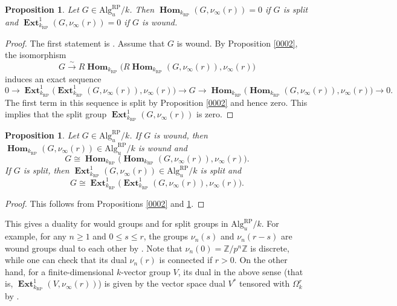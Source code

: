 \documentclass{amsart}
\newtheorem{Prop}[Thm]{Proposition}
\theoremstyle{remark}
\numberwithin{equation}{section}
\newcommand{\isomto}{\overset{\sim}{\to}}
\newcommand{\Z}{\mathbb{Z}}
\newcommand{\Alg}{\mathrm{Alg}}
\newcommand{\alg}[1]{\mathbf{#1}}
\newcommand{\RP}{\mathrm{RP}}
\DeclareMathOperator{\sheafhom}{\alg{Hom}}
\DeclareMathOperator{\sheafext}{\alg{Ext}}
\begin{document}
\begin{Prop} \label{0079}
	Let $G \in \Alg^{\RP}_{u} / k$.
	Then $\sheafhom_{k_{\RP}}(G, \nu_{\infty}(r)) = 0$ if $G$ is split
	and $\sheafext_{k_{\RP}}^{1}(G, \nu_{\infty}(r)) = 0$ if $G$ is wound.
\end{Prop}

\begin{proof}
	The first statement is \cite[Theorem 3.2 (ii)]{Kat86}.
	Assume that $G$ is wound.
	By Proposition \ref{0002}, the isomorphism
		\[
				G
			\isomto
				R \sheafhom_{k_{\RP}} \bigl(
					R \sheafhom_{k_{\RP}}(G, \nu_{\infty}(r)),
					\nu_{\infty}(r)
				\bigr)
		\]
	induces an exact sequence
		\[
				0
			\to
				\sheafext_{k_{\RP}}^{1} \bigl(
					\sheafext_{k_{\RP}}^{1}(G, \nu_{\infty}(r)),
					\nu_{\infty}(r)
				\bigr)
			\to
				G
			\to
				\sheafhom_{k_{\RP}} \bigl(
					\sheafhom_{k_{\RP}}(G, \nu_{\infty}(r)),
					\nu_{\infty}(r)
				\bigr)
			\to
				0.
		\]
	The first term in this sequence is split
	by Proposition \ref{0002} and hence zero.
	This implies that the split group
	$\sheafext_{k_{\RP}}^{1}(G, \nu_{\infty}(r))$ is zero.
\end{proof}

\begin{Prop}
	Let $G \in \Alg_{u}^{\RP} / k$.
	If $G$ is wound,
	then $\sheafhom_{k_{\RP}}(G, \nu_{\infty}(r)) \in \Alg_{u}^{\RP} / k$ is wound
	and
		\[
				G
			\cong
				\sheafhom_{k_{\RP}} \bigl(
					\sheafhom_{k_{\RP}}(G, \nu_{\infty}(r)),
					\nu_{\infty}(r)
				\bigr).
		\]
	If $G$ is split,
	then $\sheafext_{k_{\RP}}^{1}(G, \nu_{\infty}(r)) \in \Alg_{u}^{\RP} / k$ is split
	and
		\[
				G
			\cong
				\sheafext_{k_{\RP}}^{1} \bigl(
					\sheafext_{k_{\RP}}^{1}(G, \nu_{\infty}(r)),
					\nu_{\infty}(r)
				\bigr).
		\]
\end{Prop}

\begin{proof}
	This follows from Propositions \ref{0002} and \ref{0079}.
\end{proof}

This gives a duality for would groups and for split groups in $\Alg_{u}^{\RP} / k$.
For example, for any $n \ge 1$ and $0 \le s \le r$,
the groups $\nu_{n}(s)$ and $\nu_{n}(r - s)$ are wound groups dual to each other
by \cite[Theorem 4.3]{Kat86}.
Note that $\nu_{n}(0) = \Z / p^{n} \Z$ is discrete,
while one can check that its dual $\nu_{n}(r)$ is connected if $r > 0$.
On the other hand, for a finite-dimensional $k$-vector group $V$,
its dual in the above sense (that is, $\sheafext_{k_{\RP}}^{1}(V, \nu_{\infty}(r))$)
is given by the vector space dual $V^{\ast}$ tensored with $\Omega_{k}^{r}$
by \cite[Theorem 3.2 (ii)]{Kat86}.
\end{document}
